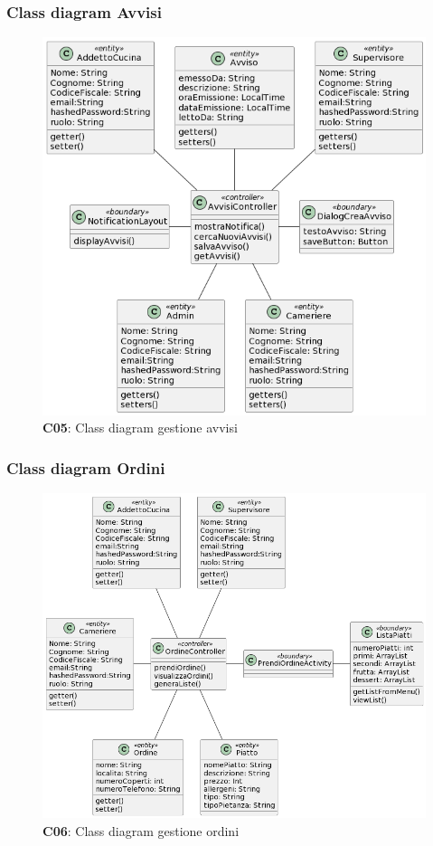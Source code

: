     \subsubsection{Class diagram Avvisi}
        \begin{figure}[H]
            \centering
            \includegraphics[scale=0.5]{assets/diagrammi/Class diagram di analisi/Gestione Avvisi.png}
            \caption{\textbf{C05}: Class diagram gestione avvisi}\label{fig:Avvisi}
        \end{figure}

    \subsubsection{Class diagram Ordini}
        \begin{figure}[H]
            \centering
            \includegraphics[scale=0.5]{assets/diagrammi/Class diagram di analisi/Gestione ordini.png}
            \caption{\textbf{C06}: Class diagram gestione ordini}\label{fig:Ordini}
        \end{figure}

